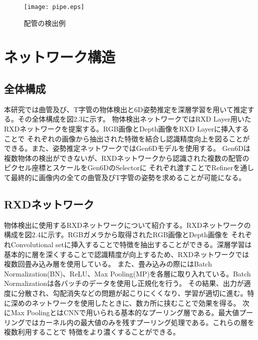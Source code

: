 \begin{figure}[htbt]
	\centering
	 \texttt{[image: pipe.eps]}
	 \caption{配管の検出例}
	 \label{fig:f2}
\end{figure}

\section{ネットワーク構造}

\subsection{全体構成}
本研究では曲管及び、T字管の物体検出と6D姿勢推定を深層学習を用いて推定する。その全体構成を図2.3に示す。
物体検出ネットワークではRXD Layer用いたRXDネットワークを提案する。RGB画像とDepth画像をRXD Layerに挿入することで
それぞれの画像から抽出された特徴を結合し認識精度向上を図ることができる。また、姿勢推定ネットワークではGen6Dモデルを使用する。
Gen6Dは複数物体の検出ができないが、RXDネットワークから認識された複数の配管のピクセル座標とスケールをGen6DのSelectorに
それぞれ渡すことでRefinerを通して最終的に画像内の全ての曲管及びT字管の姿勢を求めることが可能になる。

\subsection{RXDネットワーク}
物体検出に使用するRXDネットワークについて紹介する。RXDネットワークの構成を図2.4に示す。RGBガメラから取得されたRGB画像とDepth画像を
それぞれConvolutional setに挿入することで特徴を抽出することができる。深層学習は基本的に層を深くすることで認識精度が向上するため、RXDネットワークでは複数回畳み込み層を使用している。
また、畳み込みの際にはBatch Normalization(BN)、ReLU、Max Pooling(MP)を各層に取り入れている。Batch Normalizationは各バッチのデータを使用し正規化を行う。
その結果、出力が適度に分散され、勾配消失などの問題が起こりにくくなり、学習が適切に進む。特に深めのネットワークを使用したときに、数カ所に挟むことで効果を得る。
次にMax PoolingとはCNNで用いられる基本的なプーリング層である。最大値プーリングではカーネル内の最大値のみを残すプーリング処理である。これらの層を複数利用することで
特徴をより濃くすることができる。

